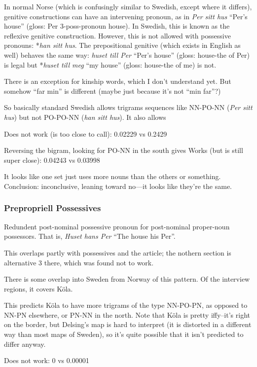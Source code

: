 In normal Norse (which is confusingly similar to Swedish, except
where it differs), genitive constructions can have an intervening
pronoun, as in {\it Per sitt hus} ``Per's house'' (gloss: Per
3-poss-pronoun house). In Swedish, this is known as the reflexive genitive
construction. However, this is not allowed with possessive pronouns:
*{\it han sitt hus}. The prepositional genitive (which exists in
English as well) behaves the same way: {\it huset till Per} ``Per's
house'' (gloss: house-the of Per) is legal but *{\it huset till meg}
``my house'' (gloss: house-the of me) is not.

There is an exception for kinship words, which I don't understand
yet. But somehow ``far min'' is different (maybe just because it's not
``min far''?)

So basically standard Swedish allows trigrams sequences like NN-PO-NN
({\it Per sitt hus}) but not  PO-PO-NN ({\it han sitt hus}). It also
allows

Does not work (is too close to call): 0.02229 vs 0.2429

Reversing the bigram, looking for PO-NN in the south gives
Works (but is still super close): 0.04243 vs 0.03998

It looks like one set just uses more nouns than the others or
something. Conclusion: inconclusive, leaning toward no---it looks like
they're the same.

\subsubsection{Prepropriell Possessives}

Redundent post-nominal possessive pronoun for post-nominal proper-noun
possessors. That is, {\it Huset hans Per} ``The house his Per''.

This overlaps partly with possessives and the article; the nothern
section is alternative 3 there, which was found not to work.

There is some overlap into Sweden from Norway of this pattern. Of the
interview regions, it covers K\"ola.

This predicts K\"ola to have more trigrams of the type NN-PO-PN, as
opposed to NN-PN elsewhere, or PN-NN in the north. Note that K\"ola is
pretty iffy--it's right on the border, but Delsing's map is hard to
interpret (it is distorted in a different way than most maps of
Sweden), so it's quite possible that it isn't predicted to differ anyway.

Does not work: 0 vs 0.00001

